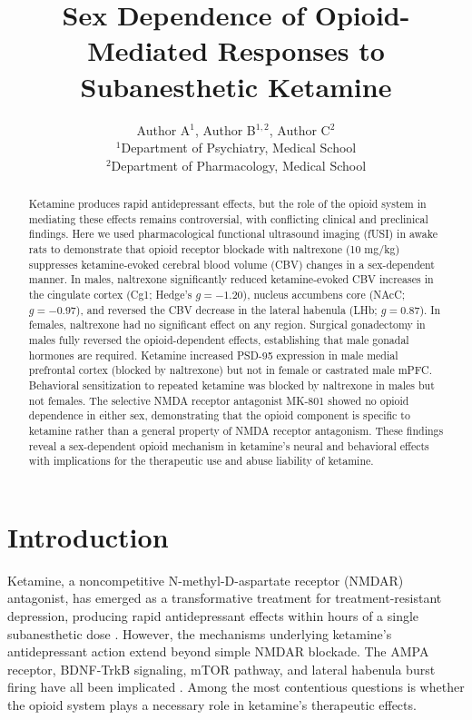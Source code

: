 \documentclass[11pt]{article}
\title{Sex Dependence of Opioid-Mediated Responses to Subanesthetic Ketamine}
\author{Author A$^{1}$, Author B$^{1,2}$, Author C$^{2}$ \\
\small $^{1}$Department of Psychiatry, Medical School \\
\small $^{2}$Department of Pharmacology, Medical School}
\date{}
\begin{document}
\maketitle

\begin{abstract}
Ketamine produces rapid antidepressant effects, but the role of the opioid system in mediating these effects remains controversial, with conflicting clinical and preclinical findings. Here we used pharmacological functional ultrasound imaging (fUSI) in awake rats to demonstrate that opioid receptor blockade with naltrexone (10 mg/kg) suppresses ketamine-evoked cerebral blood volume (CBV) changes in a sex-dependent manner. In males, naltrexone significantly reduced ketamine-evoked CBV increases in the cingulate cortex (Cg1; Hedge's $g = -1.20$), nucleus accumbens core (NAcC; $g = -0.97$), and reversed the CBV decrease in the lateral habenula (LHb; $g = 0.87$). In females, naltrexone had no significant effect on any region. Surgical gonadectomy in males fully reversed the opioid-dependent effects, establishing that male gonadal hormones are required. Ketamine increased PSD-95 expression in male medial prefrontal cortex (blocked by naltrexone) but not in female or castrated male mPFC. Behavioral sensitization to repeated ketamine was blocked by naltrexone in males but not females. The selective NMDA receptor antagonist MK-801 showed no opioid dependence in either sex, demonstrating that the opioid component is specific to ketamine rather than a general property of NMDA receptor antagonism. These findings reveal a sex-dependent opioid mechanism in ketamine's neural and behavioral effects with implications for the therapeutic use and abuse liability of ketamine.
\end{abstract}

\section{Introduction}

Ketamine, a noncompetitive N-methyl-D-aspartate receptor (NMDAR) antagonist, has emerged as a transformative treatment for treatment-resistant depression, producing rapid antidepressant effects within hours of a single subanesthetic dose \citep{berman2000,zarate2006}. However, the mechanisms underlying ketamine's antidepressant action extend beyond simple NMDAR blockade. The AMPA receptor, BDNF-TrkB signaling, mTOR pathway, and lateral habenula burst firing have all been implicated \citep{zanos2018,autry2011,li2010,yang2018}. Among the most contentious questions is whether the opioid system plays a necessary role in ketamine's therapeutic effects.
\end{document}
